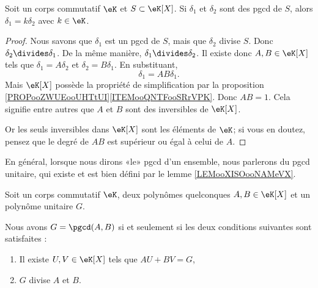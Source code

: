 \begin{lemma}      \label{LEMooXISOooNAMeVX}
    Soit un corps commutatif \( \eK\) et \( S\subset \eK[X]\). Si \( \delta_1\) et \( \delta_2\) sont des pgcd de \( S\), alors \( \delta_1=k\delta_2\) avec \( k\in \eK\).
\end{lemma}

\begin{proof}
    Nous savons que \( \delta_1\) est un pgcd de \( S\), mais que \( \delta_2\) divise \( S\). Donc \( \delta_2\divides \delta_1\). De la même manière, \( \delta_1\divides \delta_2\). Il existe donc \( A,B\in \eK[X]\) tels que \( \delta_1=A\delta_2\) et \( \delta_2=B\delta_1\). En substituant,
    \begin{equation}
        \delta_1=AB\delta_1.
    \end{equation}
    Mais \( \eK[X]\) possède la propriété de simplification par la proposition \ref{PROPooZWUEooUHTtUI}\ref{ITEMooQNTFooSRrVPK}. Donc \( AB=1\). Cela signifie entre autres que \( A\) et \( B\) sont des inversibles de \( \eK[X]\).

    Or les seuls inversibles dans \( \eK[X]\) sont les éléments de \( \eK\); si vous en doutez, pensez que le degré de \( AB\) est supérieur ou égal à celui de \( A\).
\end{proof}

\begin{normaltext}
    En général, lorsque nous dirons «le» pgcd d'un ensemble, nous parlerons du pgcd unitaire, qui existe et est bien défini par le lemme \ref{LEMooXISOooNAMeVX}.
\end{normaltext}


\begin{lemma}        \label{LEMooIAGMooHUQtUs}
    Soit un corps commutatif \( \eK\), deux polynômes quelconques \( A,B\in \eK[X]\) et un polynôme unitaire \( G\).
    
    Nous avons \( G=\pgcd(A,B)\) si et seulement si les deux conditions suivantes sont satisfaites :
    \begin{enumerate}
        \item
            Il existe \( U,V\in \eK[X]\) tels que \( AU+BV=G\),
        \item
            \( G\) divise \( A\) et \( B\).
    \end{enumerate}
\end{lemma}

